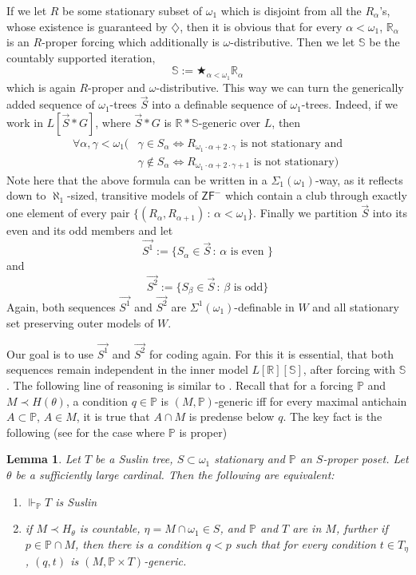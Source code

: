 \documentclass[a4paper,11pt]{article}
\newtheorem{lemma}[theorem]{Lemma}
\newcommand{\forceP}{\mathbb{P}}
\newcommand{\forceR}{\mathbb{R}}
\newcommand{\ZFP}{\mathsf{ZF}^-}
\begin{document}
If we let $R$ be some stationary subset of $\omega_1$ which is disjoint from all the $R_{\alpha}$'s, whose existence is guaranteed by $\diamondsuit$, then it is obvious that for every $\alpha < \omega_1$, $\forceR_{\alpha}$ is an $R$-proper forcing which additionally is $\omega$-distributive.  Then we let $\mathbb{S}$ be the countably supported iteration, $$\mathbb{S}:=\bigstar_{\alpha< \omega_1} \forceR_{\alpha}$$ which is again $R$-proper and $\omega$-distributive.
This way we can turn the generically added sequence of $\omega_1$-trees $\vec{S}$ into a definable sequence of $\omega_1$-trees.
Indeed, if we work in $L[\vec{S}\ast G]$, where $\vec{S} \ast G$ is $\forceR \ast \mathbb{S}$-generic over $L$, then 
\begin{align*}
\forall \alpha, \gamma < \omega_1 (&\gamma \in S_{\alpha} \Leftrightarrow R_{\omega_1 \cdot \alpha + 2 \cdot \gamma} \text{ is not stationary and} \\ &
\gamma \notin S_{\alpha} \Leftrightarrow  R_{\omega_1 \cdot \alpha + 2 \cdot \gamma +1} \text{ is not stationary})
\end{align*}
Note here that the above formula can be written in a $\Sigma_1(\omega_1)$-way, as  it reflects down to $\aleph_1$-sized, transitive models of $\ZFP$ which contain a club through exactly one element of every pair $\{(R_{\alpha}, R_{\alpha+1}) \, : \, \alpha < \omega_1\}$.
Finally we partition $\vec{S}$ into its even and its odd members and let 
\[ \vec{S^1}:= \{ S_{\alpha} \in \vec{S} \, : \, \alpha \text{ is even } \} \]
and 
\[ \vec{S^2}:= \{ S_{\beta} \in \vec{S} \, : \, \beta \text { is odd} \} \]
Again, both sequences $\vec{S^1}$ and $\vec{S^2}$ are $\Sigma^1(\omega_1)$-definable in $W$ and all stationary set preserving outer models of $W$.

Our goal is to use $\vec{S^1}$ and $\vec{S^2}$ for coding again. For this it is essential, that both sequences remain independent in the inner model $L[\forceR][\mathbb{S}]$,  after forcing with $\mathbb{S}$. 
The following  line of reasoning is similar to \cite{Ho}.
Recall that for a forcing $\forceP$ and $M \prec H(\theta)$, a condition $q \in \forceP$ is $(M,\forceP)$-generic iff for every maximal antichain $A \subset \forceP$, $A \in M$, it is true that $ A \cap M$ is predense below $q$.
The key fact is the following (see \cite{Miyamoto2} for the case where $\forceP$ is proper)
\begin{lemma}\label{preservation of Suslin trees}
 Let $T$ be a Suslin tree, $S \subset \omega_1$ stationary and $\forceP$ an $S$-proper
 poset. Let $\theta$ be a sufficiently large cardinal.
 Then the following are equivalent:
 \begin{enumerate}
  \item $\Vdash_{\forceP} T$ is Suslin
 
  \item if $M \prec H_{\theta}$ is countable, $\eta = M \cap \omega_1 \in S$, and $\forceP$ and $T$ are in $M$,
  further if $p \in \forceP \cap M$, then there is a condition $q<p$ such that 
  for every condition $t \in T_{\eta}$, 
  $(q,t)$ is $(M, \forceP \times T)$-generic.
 \end{enumerate}

\end{lemma}
\end{document}

